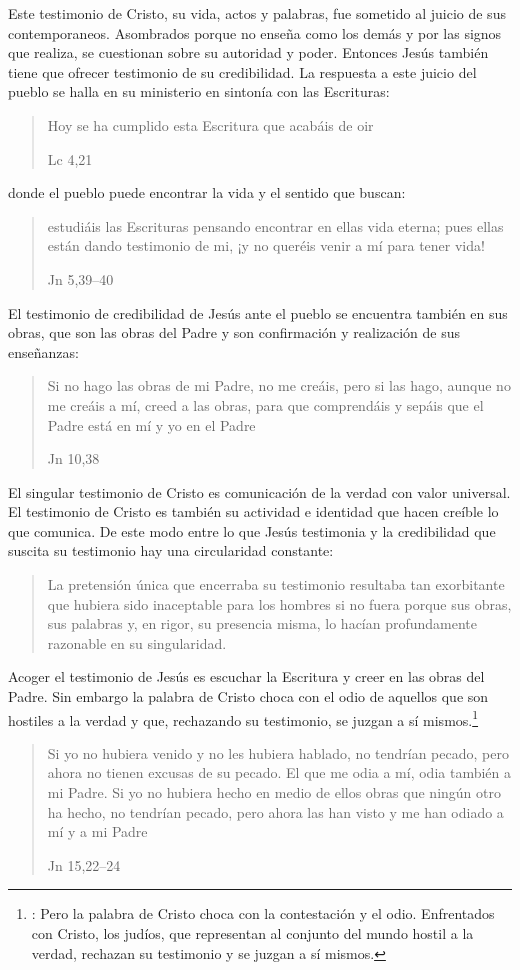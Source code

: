 Este testimonio de Cristo, su vida, actos y palabras, fue sometido al juicio de sus contemporaneos. Asombrados porque no enseña como los demás y por las signos que realiza, se cuestionan sobre su autoridad y poder. Entonces Jesús también tiene que ofrecer testimonio de su credibilidad. La respuesta a este juicio del pueblo se halla en su ministerio en sintonía con las Escrituras: \blockquote[Lc 4,21]{Hoy se ha cumplido esta Escritura que acabáis de oir}; donde el pueblo puede encontrar la vida y el sentido que buscan: \blockquote[Jn 5,39--40]{estudiáis las Escrituras pensando encontrar en ellas vida eterna; pues ellas están dando testimonio de mi, ¡y no queréis venir a mí para tener vida!}. El testimonio de credibilidad de Jesús ante el pueblo se encuentra también en sus obras, que son las obras del Padre y son confirmación y realización de sus enseñanzas: \blockquote[Jn 10,38]{Si no hago las obras de mi Padre, no me creáis, pero si las hago, aunque no me creáis a mí, creed a las obras, para que comprendáis y sepáis que el Padre está en mí y yo en el Padre}.

El singular testimonio de Cristo es comunicación de la verdad con valor universal. El testimonio de Cristo es también su actividad e identidad que hacen creíble lo que comunica. De este modo entre lo que Jesús testimonia y la credibilidad que suscita su testimonio hay una circularidad constante:

\blockquote[{\cite[124]{prades2015testimonio}}]{La pretensión única que encerraba su testimonio resultaba tan exorbitante que hubiera sido inaceptable para los hombres si no fuera porque sus obras, sus palabras y, en rigor, su presencia misma, lo hacían profundamente razonable en su singularidad.}

Acoger el testimonio de Jesús es escuchar la Escritura y creer en las obras del Padre. Sin embargo la palabra de Cristo choca con el odio de aquellos que son hostiles a la verdad y que, rechazando su testimonio, se juzgan a sí mismos.\footnote{\cite[1530]{latourelle2000testimonio}: Pero la palabra de Cristo choca con la contestación y el odio. Enfrentados con Cristo, los judíos, que representan al conjunto del mundo hostil a la verdad, rechazan su testimonio y se juzgan a sí mismos.}

\blockquote[Jn 15,22--24]{Si yo no hubiera venido y no les hubiera hablado, no tendrían pecado, pero ahora no tienen excusas de su pecado. El que me odia a mí, odia también a mi Padre. Si yo no hubiera hecho en medio de ellos obras que ningún otro ha hecho, no tendrían pecado, pero ahora las han visto y me han odiado a mí y a mi Padre}

